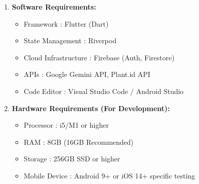 \begin{enumerate}[label={\Roman*.}]
    \item \textbf{Software Requirements:}
    \begin{itemize}
  \item Framework      \hspace{20mm}       : Flutter (Dart)
  \item State Management \hspace{6mm} : Riverpod
  \item Cloud Infrastructure \hspace{3mm}:  Firebase (Auth, Firestore)
  \item APIs \hspace{28mm}: Google Gemini API, Plant.id API
  \item Code Editor \hspace{15mm}: Visual Studio Code / Android Studio
\end{itemize}
   \item \textbf{ Hardware Requirements (For Development):}
    \begin{itemize}
  \item Processor \hspace{19mm} : i5/M1 or higher
  \item RAM \hspace{26mm} : 8GB (16GB Recommended)
  \item Storage \hspace{22mm} : 256GB SSD or higher
  \item Mobile Device \hspace{12mm} : Android 9+ or iOS 14+ specific testing
\end{itemize}
\end{enumerate}
